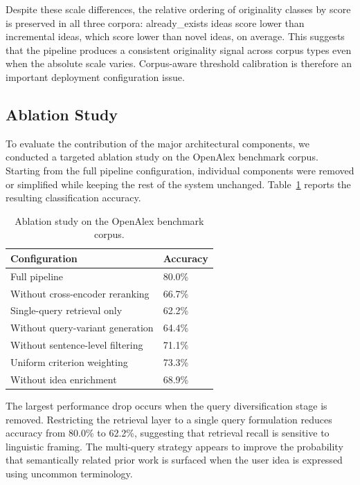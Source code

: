 Despite these scale differences, the relative ordering of originality classes by score is preserved in all three corpora: already\_exists ideas score lower than incremental ideas, which score lower than novel ideas, on average. This suggests that the pipeline produces a consistent originality signal across corpus types even when the absolute scale varies. Corpus-aware threshold calibration is therefore an important deployment configuration issue.

\subsection{Ablation Study}

To evaluate the contribution of the major architectural components, we conducted a targeted ablation study on the OpenAlex benchmark corpus. Starting from the full pipeline configuration, individual components were removed or simplified while keeping the rest of the system unchanged. Table~\ref{tab:ablation} reports the resulting classification accuracy.

\begin{table}[width=\textwidth,cols=2,pos=ht]
    \caption{Ablation study on the OpenAlex benchmark corpus.}
    \label{tab:ablation}
    \begin{tabular*}{\textwidth}{@{\extracolsep{\fill}}ll@{}}
        \toprule
        Configuration & Accuracy \\
        \midrule
        Full pipeline & 80.0\% \\
        Without cross-encoder reranking & 66.7\% \\
        Single-query retrieval only & 62.2\% \\
        Without query-variant generation & 64.4\% \\
        Without sentence-level filtering & 71.1\% \\
        Uniform criterion weighting & 73.3\% \\
        Without idea enrichment & 68.9\% \\
        \bottomrule
    \end{tabular*}
\end{table}

The largest performance drop occurs when the query diversification stage is removed. Restricting the retrieval layer to a single query formulation reduces accuracy from 80.0\% to 62.2\%, suggesting that retrieval recall is sensitive to linguistic framing. The multi-query strategy appears to improve the probability that semantically related prior work is surfaced when the user idea is expressed using uncommon terminology.

